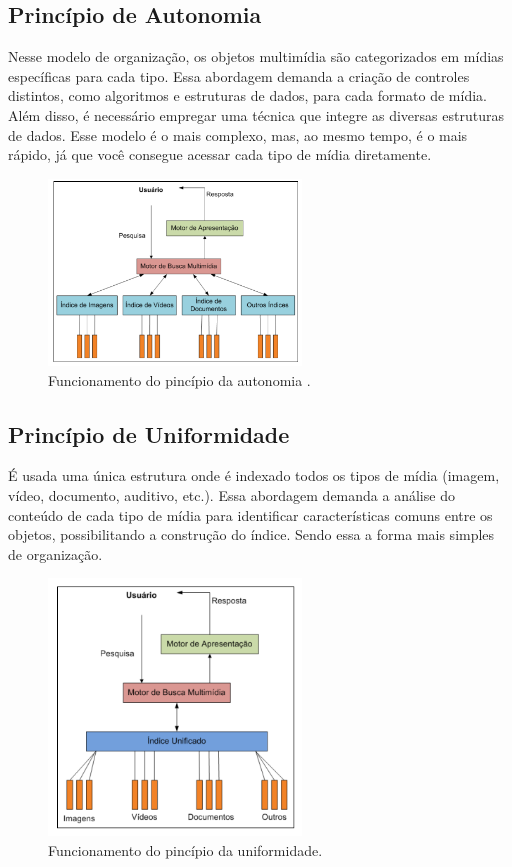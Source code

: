 \documentclass[12pt]{article}
\begin{document}
	\subsection{Princípio de Autonomia}
	Nesse modelo de organização, os objetos multimídia são categorizados em mídias específicas para cada tipo. Essa abordagem demanda a criação de controles distintos, como algoritmos e estruturas de dados, para cada formato de mídia. Além disso, é necessário empregar uma técnica que integre as diversas estruturas de dados. Esse modelo é o mais complexo, mas, ao mesmo tempo,  é o mais rápido, já que você consegue acessar cada tipo de mídia diretamente.
	\begin{figure}[ht] 
		\centering
		\includegraphics[width=0.6\textwidth]{Autonomia.png}
		\caption{Funcionamento do pincípio da autonomia .}
		\label{fig:exemplo1}
	\end{figure}
	
	\subsection{Princípio de Uniformidade}
	É usada uma única estrutura onde é indexado todos os tipos de mídia (imagem, vídeo, documento, auditivo, etc.). Essa abordagem demanda a análise do conteúdo de cada tipo de mídia para identificar características comuns entre os objetos, possibilitando a construção do índice. Sendo essa a forma mais simples de organização.
	
	\begin{figure}[ht]
		\centering
		\includegraphics[width=0.6\textwidth]{Uniformidade.png}
		\caption{Funcionamento do pincípio da uniformidade.}
		\label{fig:exemplo2}
	\end{figure}
	
\end{document}
